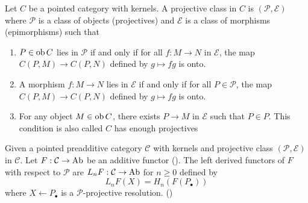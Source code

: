 \documentclass{report}
\begin{document}
\begin{definition}
    Let $C$ be a pointed category with kernels. A projective class in $C$ is $(\mathcal{P}, \mathcal{E})$ where $\mathcal{P}$ is a class of objects (projectives) and $\mathcal{E}$ is a class of morphisms (epimorphisms) such that
    \begin{enumerate}
        \item $P \in \operatorname{ob} C$ lies in $\mathcal{P}$ if and only if for all $f: M \to N$ in $\mathcal{E}$, the map $C(P, M) \to C(P, N)$ defined by $g \mapsto fg$ is onto.
        \begin{center}
        \end{center}

        \item A morphism $f: M \to N$ lies in $\mathcal{E}$ if and only if for all $P \in \mathcal{P}$, the map $C(P, M) \to C(P, N)$ defined by $g \mapsto fg$ is onto.
        \begin{center}
        \end{center}

        \item For any object $M \in \operatorname{ob} C$, there exists $P \to M$ in $\mathcal{E}$ such that $P \in P$. This condition is also called $C$ has enough projectives
    \end{enumerate}
\end{definition}

\begin{definition}
    Given a pointed preadditive category $\mathcal{C}$ with kernels and projective class $(\mathcal{P}, \mathcal{E})$ in $\mathcal{C}$. Let $F: \mathcal{C} \to \operatorname{Ab}$ be an additive functor (). The left derived functors of $F$ with respect to $\mathcal{P}$ are $L_n F: \mathcal{C} \to \operatorname{Ab}$ for $n \geq 0$ defined by
    $$
        L_n F(X) = H_n(F(P_\bullet))
    $$
    where $X \leftarrow P_\bullet$ is a $\mathcal{P}$-projective resolution. ()
\end{definition}
\end{document}
